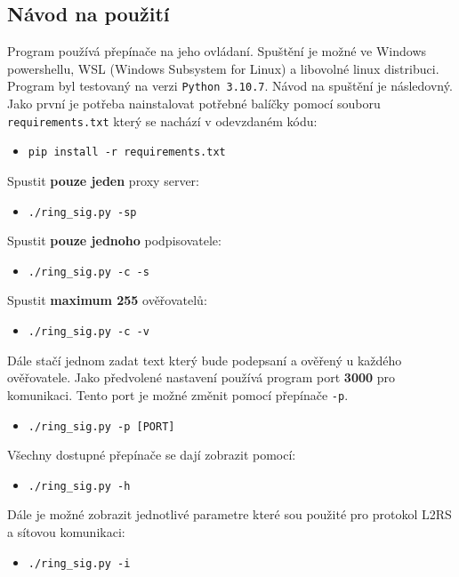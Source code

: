 \subsection{Návod na použití}
Program používá přepínače na jeho ovládaní. Spuštění je možné ve Windows powershellu, WSL (Windows Subsystem for Linux) a libovolné linux distribuci. Program byl testovaný na verzi \texttt{Python 3.10.7}. Návod na spuštění je následovný. Jako první je potřeba nainstalovat potřebné balíčky pomocí souboru \texttt{requirements.txt} který se nachází v odevzdaném kódu:
\begin{itemize}
  \item \texttt{pip install -r requirements.txt}
\end{itemize}
Spustit \textbf{pouze jeden} proxy server:
\begin{itemize}
  \item \texttt{./ring\_sig.py -sp}
\end{itemize}
Spustit \textbf{pouze jednoho} podpisovatele:
\begin{itemize}
  \item \texttt{./ring\_sig.py -c -s}
\end{itemize}
Spustit \textbf{maximum 255} ověřovatelů:
\begin{itemize}
  \item \texttt{./ring\_sig.py -c -v}
\end{itemize}
Dále stačí jednom zadat text který bude podepsaní a ověřený u každého ověřovatele. Jako předvolené nastavení používá program port \textbf{3000} pro komunikaci. Tento port je možné změnit pomocí přepínače \texttt{-p}.
\begin{itemize}
  \item \texttt{./ring\_sig.py -p [PORT]}
\end{itemize}
Všechny dostupné přepínače se dají zobrazit pomocí:
\begin{itemize}
  \item \texttt{./ring\_sig.py -h}
\end{itemize}
Dále je možné zobrazit jednotlivé parametre které sou použité pro protokol L2RS a sítovou komunikaci:
\begin{itemize}
  \item \texttt{./ring\_sig.py -i}
\end{itemize}


